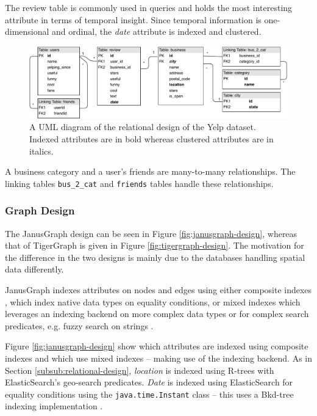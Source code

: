 The review table is commonly used in queries and holds the most interesting attribute in terms of temporal insight. Since temporal information is one-dimensional and ordinal, the \emph{date} attribute is indexed and clustered.

\begin{figure}[h]
    \centering
    \includegraphics[width=16cm]{img/schema/yelpRelational.pdf}
    \caption{A UML diagram of the relational design of the Yelp dataset. Indexed attributes are in bold whereas clustered attributes are in italics.}
    \label{fig:relational-design}
\end{figure}

A business category and a user's friends are many-to-many relationships. The linking tables \texttt{bus\_2\_cat} and \texttt{friends} tables handle these relationships.

\subsubsection{Graph Design}

The JanusGraph design can be seen in Figure \ref{fig:janusgraph-design}, whereas that of TigerGraph is given in Figure \ref{fig:tigergraph-design}. The motivation for the difference in the two designs is mainly due to the databases handling spatial data differently.

JanusGraph indexes attributes on nodes and edges using either composite indexes \cite{janusgraph-comp-index}, which index native data types on equality conditions, or mixed indexes which leverages an indexing backend on more complex data types or for complex search predicates, e.g. fuzzy search on strings \cite{janusgraph-mixed-index}.

Figure \ref{fig:janusgraph-design} show which attributes are indexed using composite indexes and which use mixed indexes -- making use of the indexing backend. As in Section \ref{subsub:relational-design}, \emph{location} is indexed using R-trees with ElasticSearch's geo-search predicates. \emph{Date} is indexed using ElasticSearch for equality conditions using the \texttt{java.time.Instant} class -- this uses a Bkd-tree indexing implementation \cite{es-bkdtree-index}.

